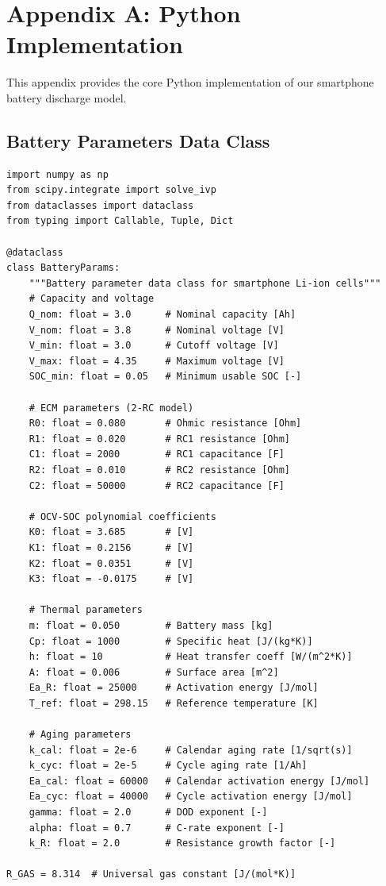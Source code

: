 
\section{Appendix A: Python Implementation}
\label{app:code}

This appendix provides the core Python implementation of our smartphone battery discharge model.

\subsection{Battery Parameters Data Class}

\begin{lstlisting}[caption={Battery Parameters Definition}, label={lst:params}]
import numpy as np
from scipy.integrate import solve_ivp
from dataclasses import dataclass
from typing import Callable, Tuple, Dict

@dataclass
class BatteryParams:
    """Battery parameter data class for smartphone Li-ion cells"""
    # Capacity and voltage
    Q_nom: float = 3.0      # Nominal capacity [Ah]
    V_nom: float = 3.8      # Nominal voltage [V]
    V_min: float = 3.0      # Cutoff voltage [V]
    V_max: float = 4.35     # Maximum voltage [V]
    SOC_min: float = 0.05   # Minimum usable SOC [-]
    
    # ECM parameters (2-RC model)
    R0: float = 0.080       # Ohmic resistance [Ohm]
    R1: float = 0.020       # RC1 resistance [Ohm]
    C1: float = 2000        # RC1 capacitance [F]
    R2: float = 0.010       # RC2 resistance [Ohm]
    C2: float = 50000       # RC2 capacitance [F]
    
    # OCV-SOC polynomial coefficients
    K0: float = 3.685       # [V]
    K1: float = 0.2156      # [V]
    K2: float = 0.0351      # [V]
    K3: float = -0.0175     # [V]
    
    # Thermal parameters
    m: float = 0.050        # Battery mass [kg]
    Cp: float = 1000        # Specific heat [J/(kg*K)]
    h: float = 10           # Heat transfer coeff [W/(m^2*K)]
    A: float = 0.006        # Surface area [m^2]
    Ea_R: float = 25000     # Activation energy [J/mol]
    T_ref: float = 298.15   # Reference temperature [K]
    
    # Aging parameters
    k_cal: float = 2e-6     # Calendar aging rate [1/sqrt(s)]
    k_cyc: float = 2e-5     # Cycle aging rate [1/Ah]
    Ea_cal: float = 60000   # Calendar activation energy [J/mol]
    Ea_cyc: float = 40000   # Cycle activation energy [J/mol]
    gamma: float = 2.0      # DOD exponent [-]
    alpha: float = 0.7      # C-rate exponent [-]
    k_R: float = 2.0        # Resistance growth factor [-]

R_GAS = 8.314  # Universal gas constant [J/(mol*K)]
\end{lstlisting}

